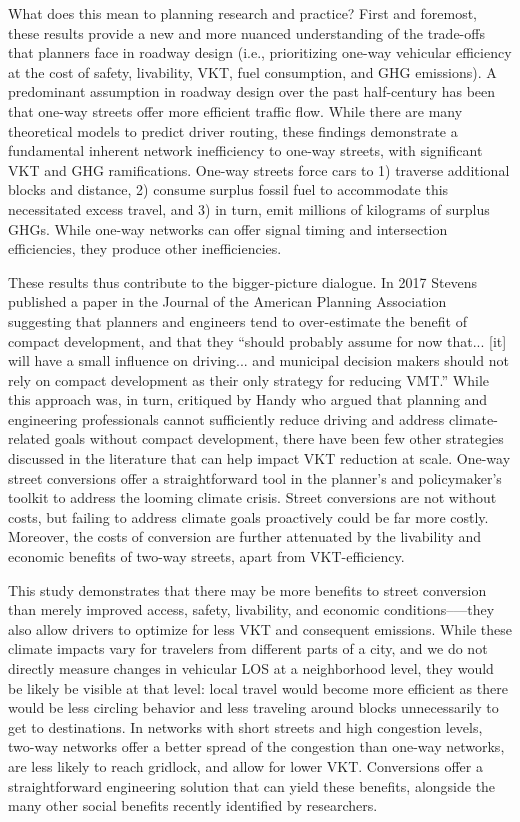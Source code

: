 \documentclass{article}
\begin{document}
What does this mean to planning research and practice? First and foremost, these results provide a new and more nuanced understanding of the trade-offs that planners face in roadway design (i.e., prioritizing one-way vehicular efficiency at the cost of safety, livability, VKT, fuel consumption, and GHG emissions). A predominant assumption in roadway design over the past half-century has been that one-way streets offer more efficient traffic flow. While there are many theoretical models to predict driver routing, these findings demonstrate a fundamental inherent network inefficiency to one-way streets, with significant VKT and GHG ramifications. One-way streets force cars to 1) traverse additional blocks and distance, 2) consume surplus fossil fuel to accommodate this necessitated excess travel, and 3) in turn, emit millions of kilograms of surplus GHGs. While one-way networks can offer signal timing and intersection efficiencies, they produce other inefficiencies.

These results thus contribute to the bigger-picture dialogue. In 2017 Stevens \citep{stevens_does_2017} published a paper in the Journal of the American Planning Association suggesting that planners and engineers tend to over-estimate the benefit of compact development, and that they \enquote{should probably assume for now that... [it] will have a small influence on driving... and municipal decision makers should not rely on compact development as their only strategy for reducing VMT.} While this approach was, in turn, critiqued by Handy \citep{handy_thoughts_2017} who argued that planning and engineering professionals cannot sufficiently reduce driving and address climate-related goals without compact development, there have been few other strategies discussed in the literature that can help impact VKT reduction at scale. One-way street conversions offer a straightforward tool in the planner's and policymaker's toolkit to address the looming climate crisis. Street conversions are not without costs, but failing to address climate goals proactively could be far more costly. Moreover, the costs of conversion are further attenuated by the livability and economic benefits of two-way streets, apart from VKT-efficiency.

This study demonstrates that there may be more benefits to street conversion than merely improved access, safety, livability, and economic conditions--—they also allow drivers to optimize for less VKT and consequent emissions. While these climate impacts vary for travelers from different parts of a city, and we do not directly measure changes in vehicular LOS at a neighborhood level, they would be likely be visible at that level: local travel would become more efficient as there would be less circling behavior and less traveling around blocks unnecessarily to get to destinations. In networks with short streets and high congestion levels, two-way networks offer a better spread of the congestion than one-way networks, are less likely to reach gridlock, and allow for lower VKT. Conversions offer a straightforward engineering solution that can yield these benefits, alongside the many other social benefits recently identified by researchers.
\end{document}
